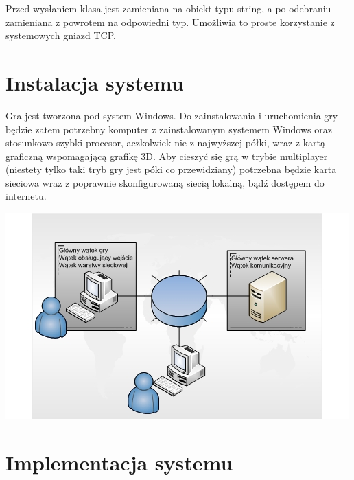 \documentclass[12pt,a4paper,twoside]{article}
\begin{document}
Przed wysłaniem klasa jest zamieniana na obiekt typu string, a po odebraniu zamieniana z powrotem na odpowiedni typ. Umożliwia to proste korzystanie z systemowych gniazd TCP.

\section{Instalacja systemu}


Gra jest tworzona pod system Windows. Do zainstalowania i uruchomienia gry będzie zatem potrzebny komputer z zainstalowanym systemem Windows oraz stosunkowo szybki procesor, aczkolwiek nie z najwyższej półki, wraz z kartą graficzną wspomagającą grafikę 3D. Aby cieszyć się grą w trybie multiplayer (niestety tylko taki tryb gry jest póki co przewidziany) potrzebna będzie karta sieciowa wraz z poprawnie skonfigurowaną siecią lokalną, bądź dostępem do internetu.

\includegraphics{pics/physicalNodes.jpg}

\section{Implementacja systemu}

\end{document}

